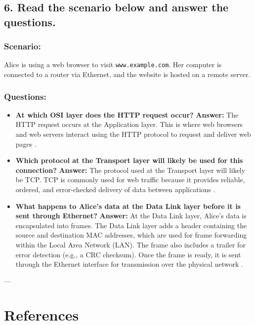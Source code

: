 \documentclass{article}
\begin{document}
\subsection*{6. Read the scenario below and answer the questions.}

\subsubsection*{Scenario:}
Alice is using a web browser to visit \texttt{www.example.com}. Her computer is connected to a router via Ethernet, and the website is hosted on a remote server.

\subsubsection*{Questions:}

\begin{itemize}
    \item \textbf{At which OSI layer does the HTTP request occur?}  
    \textbf{Answer:} The HTTP request occurs at the Application layer. This is where web browsers and web servers interact using the HTTP protocol to request and deliver web pages \cite{gfg1}.
    
    \item \textbf{Which protocol at the Transport layer will likely be used for this connection?}  
    \textbf{Answer:} The protocol used at the Transport layer will likely be TCP. TCP is commonly used for web traffic because it provides reliable, ordered, and error-checked delivery of data between applications \cite{gfg2}.
    
    \item \textbf{What happens to Alice's data at the Data Link layer before it is sent through Ethernet?}  
    \textbf{Answer:} At the Data Link layer, Alice's data is encapsulated into frames. The Data Link layer adds a header containing the source and destination MAC addresses, which are used for frame forwarding within the Local Area Network (LAN). The frame also includes a trailer for error detection (e.g., a CRC checksum). Once the frame is ready, it is sent through the Ethernet interface for transmission over the physical network \cite{fcc}.
\end{itemize}

---

\section*{References}
\end{document}

